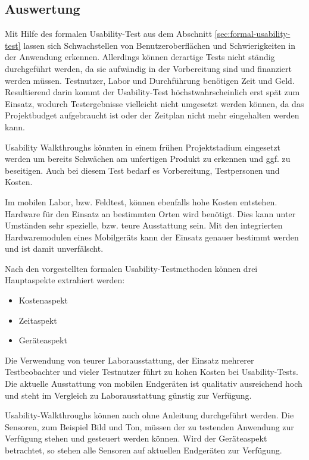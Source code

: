 \cite{usabilityblog_wasBeachten}

\cite{usabilityblog_eResult}

\subsection{Auswertung}

Mit Hilfe des formalen Usability-Test aus dem Abschnitt \ref{sec:formal-usability-test} lassen sich Schwachstellen von Benutzeroberflächen und Schwierigkeiten in der Anwendung erkennen.
Allerdings können derartige Tests nicht ständig durchgeführt werden, da sie aufwändig in der Vorbereitung sind und finanziert werden müssen. 
Testnutzer, Labor und Durchführung benötigen Zeit und Geld. 
Resultierend darin kommt der Usability-Test höchstwahrscheinlich erst spät zum Einsatz, wodurch Testergebnisse vielleicht nicht umgesetzt werden können, da das Projektbudget aufgebraucht ist oder der Zeitplan nicht mehr eingehalten werden kann. 

Usability Walkthroughs könnten in einem frühen Projektstadium eingesetzt werden um bereits Schwächen am unfertigen Produkt zu erkennen und ggf. zu beseitigen. 
Auch bei diesem Test bedarf es Vorbereitung, Testpersonen und Kosten.

Im mobilen Labor, bzw. Feldtest, können ebenfalls hohe Kosten entstehen. 
Hardware für den Einsatz an bestimmten Orten wird benötigt. 
Dies kann unter Umständen sehr spezielle, bzw. teure Ausstattung sein. 
Mit den integrierten Hardwaremodulen eines Mobilgeräts kann der Einsatz genauer bestimmt werden und ist damit unverfälscht.

Nach den vorgestellten formalen Usability-Testmethoden können drei Hauptaspekte extrahiert werden: 
\begin{itemize}
	\item{Kostenaspekt}
	\item{Zeitaspekt}
	\item{Geräteaspekt}
\end{itemize}

Die Verwendung von teurer Laborausstattung, der Einsatz mehrerer Testbeobachter und vieler Testnutzer führt zu hohen Kosten bei Usability-Tests. 
Die aktuelle Ausstattung von mobilen Endgeräten ist qualitativ ausreichend hoch und steht im Vergleich zu Laborausstattung günstig zur Verfügung. 

Usability-Walkthroughs können auch ohne Anleitung durchgeführt werden. 
Die Sensoren, zum Beispiel Bild und Ton, müssen der zu testenden Anwendung zur Verfügung stehen und gesteuert werden können. 
Wird der Geräteaspekt betrachtet, so stehen alle Sensoren auf aktuellen Endgeräten zur Verfügung.

